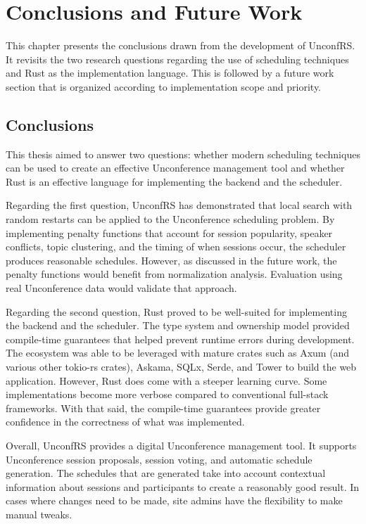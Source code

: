 \chapter{Conclusions and Future Work}\label{ch:conclusions}
This chapter presents the conclusions drawn from the development of UnconfRS. It revisits the two research questions regarding the use of scheduling techniques and Rust as the implementation language. This is followed by a future work section that is organized according to implementation scope and priority.

\section{Conclusions}
This thesis aimed to answer two questions: whether modern scheduling techniques can be used to create an effective Unconference management tool and whether Rust is an effective language for implementing the backend and the scheduler.

Regarding the first question, UnconfRS has demonstrated that local search with random restarts can be applied to the Unconference scheduling problem. By implementing penalty functions that account for session popularity, speaker conflicts, topic clustering, and the timing of when sessions occur, the scheduler produces reasonable schedules. However, as discussed in the future work, the penalty functions would benefit from normalization analysis. Evaluation using real Unconference data would validate that approach.

Regarding the second question, Rust proved to be well-suited for implementing the backend and the scheduler. The type system and ownership model provided compile-time guarantees that helped prevent runtime errors during development. The ecosystem was able to be leveraged with mature crates such as Axum (and various other tokio-rs crates), Askama, SQLx, Serde, and Tower to build the web application. However, Rust does come with a steeper learning curve. Some implementations become more verbose compared to conventional full-stack frameworks. With that said, the compile-time guarantees provide greater confidence in the correctness of what was implemented.

Overall, UnconfRS provides a digital Unconference management tool. It supports Unconference session proposals, session voting, and automatic schedule generation. The schedules that are generated take into account contextual information about sessions and participants to create a reasonably good result. In cases where changes need to be made, site admins have the flexibility to make manual tweaks.
%
